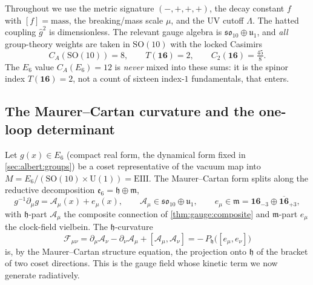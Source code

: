 \documentclass[11pt]{article}
\theoremstyle{plain}
\theoremstyle{definition}
\theoremstyle{remark}
\newcommand{\SO}[1]{\mathrm{SO}(#1)}
\newcommand{\U}[1]{\mathrm{U}(#1)}
\newcommand{\SOTen}{\SO{10}}
\newcommand{\UOne}{\U{1}}
\newcommand{\ghat}{\hat g}
\begin{document}
Throughout we use the metric signature $(-,+,+,+)$, the decay constant
$f$ with $[f]=\text{mass}$, the breaking/mass scale $\mu$, and the UV
cutoff $\Lambda$. The hatted coupling $\ghat^{2}$ is dimensionless. The
relevant gauge algebra is $\mathfrak{so}_{10}\oplus\mathfrak u_{1}$, and
\emph{all} group-theory weights are taken in $\SOTen$ with the locked
Casimirs
\begin{equation}\label{eq:app-ym:casimirs}
  C_{A}(\SOTen)=8,\qquad
  T(\mathbf{16})=2,\qquad
  C_{2}(\mathbf{16})=\tfrac{45}{8}.
\end{equation}
The $E_{6}$ value $C_{A}(E_{6})=12$ is \emph{never} mixed into these
sums: it is the spinor index $T(\mathbf{16})=2$, not a count of sixteen
index-$1$ fundamentals, that enters.

\subsection{The Maurer--Cartan curvature and the one-loop determinant}
\label{sec:app-ym:setup}

Let $g(x)\in E_{6}$ (compact real form, the dynamical form fixed in
\autoref{sec:albert:groups}) be a coset representative of the
vacuum map into $M=E_{6}/(\SOTen\times\UOne)=\mathrm{EIII}$. The
Maurer--Cartan form splits along the reductive decomposition
$\mathfrak e_{6}=\mathfrak h\oplus\mathfrak m$,
\begin{equation}\label{eq:app-ym:MC}
  g^{-1}\partial_{\mu}g
  = \mathcal A_{\mu}(x) + e_{\mu}(x),
  \qquad
  \mathcal A_{\mu}\in\mathfrak{so}_{10}\oplus\mathfrak u_{1},
  \qquad
  e_{\mu}\in\mathfrak m
  =\mathbf{16}_{-3}\oplus\overline{\mathbf{16}}_{+3},
\end{equation}
with $\mathfrak h$-part $\mathcal A_{\mu}$ the composite connection of
\autoref{thm:gauge:composite} and $\mathfrak m$-part $e_{\mu}$ the
clock-field vielbein. The $\mathfrak h$-curvature
\begin{equation}\label{eq:app-ym:curv}
  \mathcal F_{\mu\nu}
  =\partial_{\mu}\mathcal A_{\nu}-\partial_{\nu}\mathcal A_{\mu}
   +[\mathcal A_{\mu},\mathcal A_{\nu}]
  =-\,P_{\mathfrak h}\bigl([e_{\mu},e_{\nu}]\bigr)
\end{equation}
is, by the Maurer--Cartan structure equation, the projection onto
$\mathfrak h$ of the bracket of two coset directions. This is the gauge
field whose kinetic term we now generate radiatively.
\end{document}
